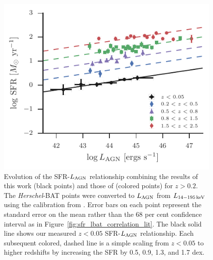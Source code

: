 \documentclass[fleqn, usenatbib]{mnras}
\newcommand{\herschel}{\emph{Herschel}}
\begin{document}
\begin{figure}
\includegraphics[width=\columnwidth]{figures/lagn_sfr_relationship_with_stanley15}
\caption{\label{fig:sfr_lagn_correlation_stanley15} Evolution of the SFR-$L_{\rm AGN}$ relationship combining the results of this work (black points) and those of \citet{Stanley:2015qy} (colored points) for $z > 0.2$. The \herschel-BAT points were converted to $L_{\rm AGN}$ from $L_{\rm 14-195\,keV}$ using the calibration from \citet{Winter:2012yq}. Error bars on each point represent the standard error on the mean rather than the 68 per cent confidence interval as in Figure~\ref{fig:sfr_lbat_correlation_lit}. The black solid line shows our measured $z < 0.05$ SFR-$L_{\rm AGN}$ relationship. Each subsequent colored, dashed line is a simple scaling from $z < 0.05$ to higher redshifts by increasing the SFR by 0.5, 0.9, 1.3, and 1.7 dex.}
\end{figure}
\end{document}
